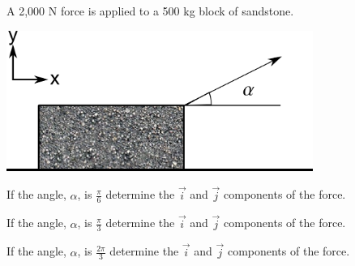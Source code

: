 


\begin{problem}
\item A 2,000 N force is applied to a 500 kg block of sandstone.

  \includegraphics[width=10cm]{ink/week7/dragBlock}

  \begin{subproblem}
  \item If the angle, $\alpha$, is $\frac{\pi}{6}$ determine the
    $\vec{i}$ and $\vec{j}$ components of the force.
    \vfill
  \item If the angle, $\alpha$, is $\frac{\pi}{3}$ determine the
    $\vec{i}$ and $\vec{j}$ components of the force.
    \vfill
  \item If the angle, $\alpha$, is $\frac{2\pi}{3}$ determine the
    $\vec{i}$ and $\vec{j}$ components of the force.
    \vfill
  \end{subproblem}
\end{problem}


